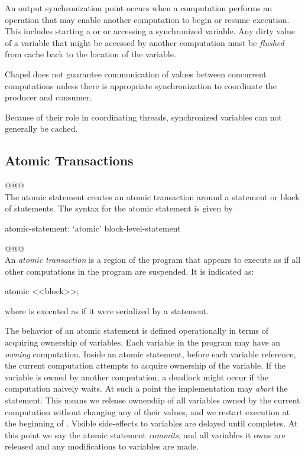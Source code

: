 An output synchronization point occurs when a computation performs an
operation that may enable another computation to begin or resume
execution. This includes starting a  or  or
accessing a synchronized variable.  Any dirty value of a variable that
might be accessed by another computation must be {\em flushed} from
cache back to the location of the variable.

Chapel does not guarantee communication of values between concurrent
computations unless there is appropriate synchronization to coordinate
the producer and consumer.

Because of their role in coordinating threads, synchronized variables
can not generally be cached.

\subsection{Atomic Transactions}
\label{Atomic_Transactions}

\noindent @@@\hrulefill \\
The atomic statement creates an atomic transaction around a statement
or block of statements.  The syntax for the atomic statement is given
by
\begin{syntax}
atomic-statement:
  `atomic' block-level-statement
\end{syntax}
\noindent @@@\hrulefill \\

An {\em atomic transaction} is a region of the program that appears to
execute as if all other computations in the program are suspended. It
is indicated as:
\begin{chapel}
atomic <<block>>;
\end{chapel}
where  is executed as if it were serialized by a
 statement.

The behavior of an atomic statement is defined operationally in terms
of acquiring ownership of variables. Each variable in the program may
have an {\em owning} computation. Inside an atomic statement, before
each variable reference, the current computation attempts to acquire
ownership of the variable. If the variable is owned by another
computation, a deadlock might occur if the computation naively
waits. At such a point the implementation may {\em abort} the
statement. This means we release ownership of all variables owned by
the current computation without changing any of their values, and we
restart execution at the beginning of .  Visible
side-effects to variables are delayed until 
completes. At this point we say the atomic statement {\em commits},
and all variables it owns are released and any modifications to
variables are made.


